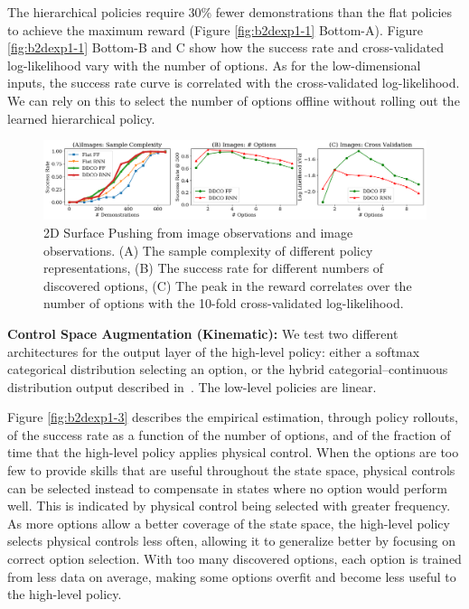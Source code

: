   The hierarchical policies require 30\% fewer demonstrations than the flat policies to achieve the maximum reward (Figure \ref{fig:b2dexp1-1} Bottom-A).
Figure \ref{fig:b2dexp1-1} Bottom-B and C show how the success rate and cross-validated log-likelihood vary with the number of options.
As for the low-dimensional inputs, the success rate curve is correlated with the cross-validated log-likelihood.
We can rely on this to select the number of options offline without rolling out the learned hierarchical policy.

\begin{figure}[ht!]
    \centering
    \includegraphics[width=\textwidth]{ddco-experiments/exp1-2.png}
    \caption{2D Surface Pushing from image observations and image observations. (A) The sample complexity of different policy representations, (B) The success rate for different numbers of discovered options, (C) The peak in the reward correlates over the number of options with the 10-fold cross-validated log-likelihood. \label{fig:b2dexp1-2}}
\end{figure}

\vspace{0.25em}\noindent\textbf{Control Space Augmentation (Kinematic): } 
We test two different architectures for the output layer of the high-level policy: either a softmax categorical distribution selecting an option, or the hybrid categorial--continuous distribution output described in~.
The low-level policies are linear.

Figure \ref{fig:b2dexp1-3} describes the empirical estimation, through policy rollouts, of the success rate as a function of the number of options, and of the fraction of time that the high-level policy applies physical control.
When the options are too few to provide skills that are useful throughout the state space, physical controls can be selected instead to compensate in states where no option would perform well. This is indicated by physical control being selected with greater frequency. As more options allow a better coverage of the state space, the high-level policy selects physical controls less often, allowing it to generalize better by focusing on correct option selection. With too many discovered options, each option is trained from less data on average, making some options overfit and become less useful to the high-level policy.

